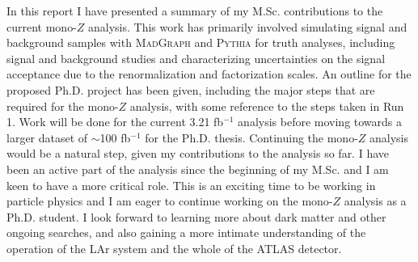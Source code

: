 \label{chapter:conclusions}

In this report I have presented a summary of my M.Sc. contributions to the current mono-$Z$ analysis. This work has primarily involved simulating signal and background samples with \textsc{MadGraph} and \textsc{Pythia} for truth analyses, including signal and background studies and characterizing uncertainties on the signal acceptance due to the renormalization and factorization scales. An outline for the proposed Ph.D. project has been given, including the major steps that are required for the mono-$Z$ analysis, with some reference to the steps taken in Run 1. Work will be done for the current 3.21 fb$^{-1}$ analysis before moving towards a larger dataset of $\sim$100 fb$^{-1}$ for the Ph.D. thesis. Continuing the mono-$Z$ analysis would be a natural step, given my contributions to the analysis so far. I have been an active part of the analysis since the beginning of my M.Sc. and I am keen to have a more critical role. This is an exciting time to be working in particle physics and I am eager to continue working on the mono-$Z$ analysis as a Ph.D. student. I look forward to learning more about dark matter and other ongoing searches, and also gaining a more intimate understanding of the operation of the LAr system and the whole of the ATLAS detector.